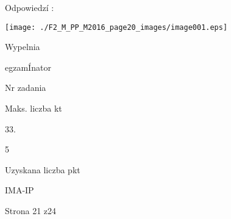 \documentclass[a4paper,12pt]{article}
\begin{document}
Odpowiedzí :
\begin{center}
\texttt{[image: ./F2\_M\_PP\_M2016\_page20\_images/image001.eps]}
\end{center}
Wypelnia

egzamÍnator

Nr zadania

Maks. liczba kt

33.

5

Uzyskana liczba pkt

IMA-IP

Strona 21 z24
\end{document}
